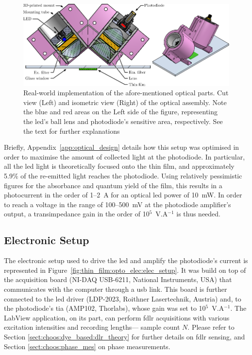 \begin{figure}
	\includegraphics{1_main_matter/thin_film_figures/optoelectronics/optics_cut.pdf}
	\caption[Real-world implementation of the afore-mentioned optical parts.]{Real-world implementation of the afore-mentioned optical parts. Cut view (Left) and isometric view (Right) of the optical assembly. Note the blue and red areas on the Left side of the figure, representing the \gls{led}'s ball lens and photodiode's sensitive area, respectively. See the text for further explanations}
	\label{fig:thin_film:opto_elec:optics_cut}
\end{figure}

Briefly, Appendix~\ref{app:optical_design} details how this setup was optimised in order to maximise the amount of collected light at the photodiode. In particular, all the \gls{led} light is theoretically focused onto the thin film, and approximately 5.9\% of the re-emitted light reaches the photodiode. Using relatively pessimistic figures for the absorbance and quantum yield of the film, this results in a photocurrent in the order of 1--2~{\textmu}A for an optical \gls{led} power of 10~mW. In order to reach a voltage in the range of 100--500~mV at the photodiode amplifier's output, a transimpedance gain in the order of 10$^5$~V.A$^{-1}$ is thus needed.

\subsection{Electronic Setup}

The electronic setup used to drive the \gls{led} and amplify the photodiode's current is represented in Figure~\ref{fig:thin_film:opto_elec:elec_setup}. It was build on top of the acquisition board (NI-DAQ USB-6211, National Instruments, USA) that communicates with the computer through a \gls{usb} link. This board is further connected to the \gls{led} driver (LDP-2023, Roithner Lasertechnik, Austria) and, to the photodiode's \gls{tia} (AMP102, Thorlabs), whose gain was set to 10$^5$~V.A$^{-1}$. The LabView application, on its part, can perform \gls{fdlr} acquisitions with various excitation intensities and recording lengths---\ie{} sample count $N$. Please refer to Section \ref{sect:choos:dye_based:dlr_theory} for further details on \gls{fdlr} sensing, and Section \ref{sect:choos:phase_mes} on phase measurements.

